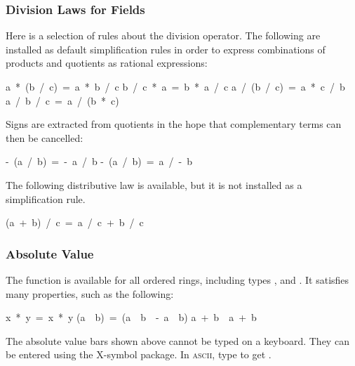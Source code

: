 \subsubsection{Division Laws for Fields}

Here is a selection of rules about the division operator.  The following
are installed as default simplification rules in order to express
combinations of products and quotients as rational expressions:
\begin{isabelle}
a\ *\ (b\ /\ c)\ =\ a\ *\ b\ /\ c
\isanewline
b\ /\ c\ *\ a\ =\ b\ *\ a\ /\ c
\isanewline
a\ /\ (b\ /\ c)\ =\ a\ *\ c\ /\ b
\isanewline
a\ /\ b\ /\ c\ =\ a\ /\ (b\ *\ c)
\end{isabelle}

Signs are extracted from quotients in the hope that complementary terms can
then be cancelled:
\begin{isabelle}
-\ (a\ /\ b)\ =\ -\ a\ /\ b
\isanewline
-\ (a\ /\ b)\ =\ a\ /\ -\ b
\end{isabelle}

The following distributive law is available, but it is not installed as a
simplification rule.
\begin{isabelle}
(a\ +\ b)\ /\ c\ =\ a\ /\ c\ +\ b\ /\ c%
\end{isabelle}


\subsubsection{Absolute Value}

The  function  is available for all 
ordered rings, including types ,  and .
It satisfies many properties,
such as the following:
\begin{isabelle}
\isasymbar x\ *\ y\isasymbar \ =\ \isasymbar x\isasymbar \ *\ \isasymbar y\isasymbar 
{}\isanewline
(\isasymbar a\isasymbar \ \isasymle \ b)\ =\ (a\ \isasymle \ b\ \isasymand \ -\ a\ \isasymle \ b)
\isanewline
\isasymbar a\ +\ b\isasymbar \ \isasymle \ \isasymbar a\isasymbar \ +\ \isasymbar b\isasymbar 
{}
\end{isabelle}

\begin{warn}
The absolute value bars shown above cannot be typed on a keyboard.  They
can be entered using the X-symbol package.  In \textsc{ascii}, type  to
get .
\end{warn}


